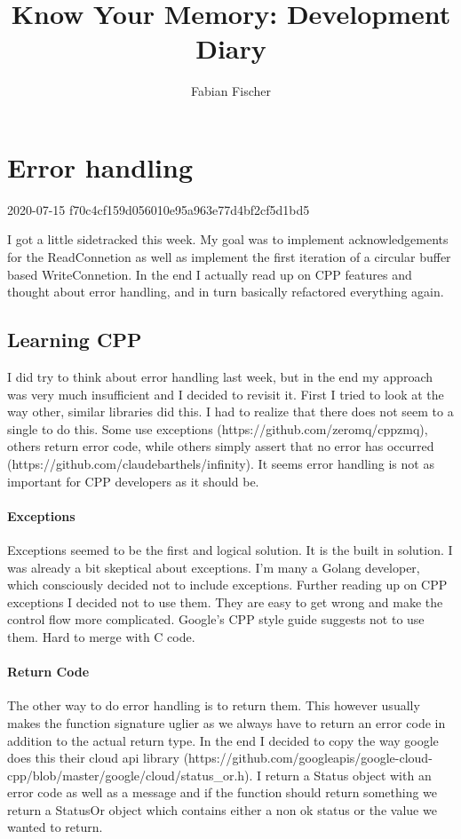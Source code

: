 \documentclass[a4paper,twoside]{article} %
\title{Know Your Memory: Development Diary}
\author{Fabian Fischer}
\newcommand{\entry}[3]{\section*{#3}#1  #2}
\begin{document}


\entry{2020-07-15}{f70c4cf159d056010e95a963e77d4bf2cf5d1bd5}{Error handling}

I got a little sidetracked this week. My goal was to implement acknowledgements for the ReadConnetion as well as implement
the first iteration of a circular buffer based WriteConnetion. In the end I actually read up on CPP features and thought about
error handling, and in turn basically refactored everything again.

\subsection*{Learning CPP}

I did try to think about error handling last week, but in the end my approach was very much insufficient and I decided to 
revisit it. First I tried to look at the way other, similar libraries did this. I had to realize that there does not seem 
to a single to do this. Some use exceptions (https://github.com/zeromq/cppzmq), others return error code, while others 
simply assert that no error has occurred (https://github.com/claudebarthels/infinity). It seems error handling is not as 
important for CPP developers as it should be.

\paragraph{Exceptions} Exceptions seemed to be the first and logical solution. It is the built in solution. I was already a bit
skeptical about exceptions. I'm many a Golang developer, which consciously decided not to include exceptions. Further reading up
on CPP exceptions I decided not to use them. They are easy to get wrong and make the control flow more complicated. Google's 
CPP style guide suggests not to use them. Hard to merge with C code.

\paragraph{Return Code} The other way to do error handling is to return them. This however usually makes the function signature
uglier as we always have to return an error code in addition to the actual return type. In the end I decided to copy the way 
google does this their cloud api library (https://github.com/googleapis/google-cloud-cpp/blob/master/google/cloud/status\_or.h).
I return a Status object with an error code as well as a message and if the function should return something we return a 
StatusOr object which contains either a non ok status or the value we wanted to return.
\end{document}
